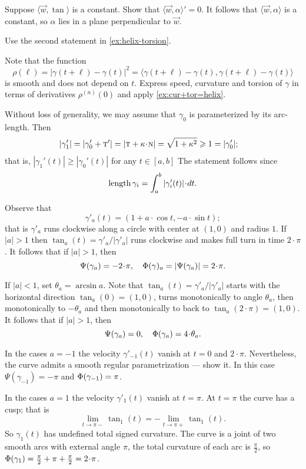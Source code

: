 Suppose $\langle \vec w,\tan\rangle$ is a constant.
Show that $\langle \vec w,\alpha\rangle'=0$.
It follows that $\langle \vec w,\alpha\rangle$ is a constant,
so $\alpha$ lies in a plane perpendicular to $\vec w$.


 Use the second statement in \ref{ex:helix-torsion}.

 Note that the function
\[\rho(\ell)=|\gamma(t+\ell)-\gamma(t)|^2=\langle \gamma(t+\ell)-\gamma(t),\gamma(t+\ell)-\gamma(t)\rangle\] 
is smooth and does not depend on $t$.
Express speed, curvature and torsion of $\gamma$ in terms of derivatives $\rho^{(n)}(0)$
and apply \ref{ex:cur+tor=helix}.

Without loss of generality, we may assume that $\gamma_0$ is parameterized by its arc-length.
Then
\begin{align*}
|\gamma_1'|&=|\gamma_0'+\tan'|=|\tan+\kur\cdot\norm|=
\sqrt{1+\kur^2}\ge
1=
|\gamma_0'|;
\end{align*}
that is, $|\gamma_1'(t)|\ge|\gamma_0'(t)|$ for any $t\in[a,b]$
The statement follows since 
\[\length\gamma_i=\int_a^b|\gamma_i'(t)|\cdot dt.\]





Observe that
\[\gamma'_a(t)=(1+a\cdot \cos t, -a\cdot \sin t);\]
that is $\gamma'_a$ runs clockwise along a circle with center at $(1,0)$ and radius $1$.
If $|a|>1$ then $\tan_a(t)=\gamma'_a/|\gamma'_a|$ runs clockwise and makes full turn in time $2\cdot\pi$.
It follows that if $|a|>1$, then
\[\Psi(\gamma_a)=-2\cdot\pi,\quad \tc\gamma_a=|\Psi(\gamma_a)|=2\cdot\pi.\]

If $|a|<1$, set $\theta_a=\arcsin a$.
Note that $\tan_a(t)=\gamma'_a/|\gamma'_a|$ starts with the horizontal direction $\tan_a(0)=(1,0)$, turns monotonically to angle $\theta_a$, then monotonically to $-\theta_a$ and then monotonically to back to $\tan_a(2\cdot\pi)=(1,0)$.
It follows that if $|a|>1$, then
\[\Psi(\gamma_a)=0,\quad \tc{\gamma_a}=4\cdot\theta_a.\]

In the cases $a=-1$ the velocity $\gamma'_{-1}(t)$ vanish at $t=0$ and $2\cdot\pi$.
Nevertheless, the curve admits a smooth regular parametrization --- show it.
In this case $\Psi(\gamma_{-1})=-\pi$ and $\Phi({\gamma_{-1}})=\pi$.

In the cases $a=1$ the velocity $\gamma'_1(t)$ vanish at $t=\pi$.
At $t=\pi$ the curve has a cusp;
that is 
\[\lim_{t\to\pi-}\tan_1(t)=-\lim_{t\to\pi+}\tan_1(t).\]
So $\gamma_1(t)$ has undefined total signed curvature.
The curve is a joint of two smooth arcs with external angle $\pi$,
the total curvature of each arc is $\tfrac\pi2$, so 
$\tc{\gamma_{1}}=\tfrac\pi2+\pi+\tfrac\pi2=2\cdot\pi$.



